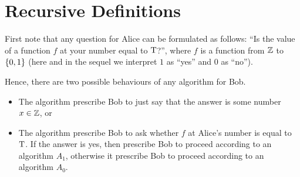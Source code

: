 \section{Recursive Definitions}
First note that any question for Alice can be formulated as follows:
``Is the value of a function $f$ at your number equal to $\text{T}$?'', where
$f$ is a function from ${\mathbb{Z}}$ to $\set{0, 1}$ (here and in the sequel
we interpret $1$ as ``yes'' and $0$ as ``no'').

Hence, there are two possible behaviours of any algorithm for Bob.
\begin{itemize}
  \item The algorithm prescribe Bob to just say that the answer is some
    number $x \in {\mathbb{Z}}$, or
  \item The algorithm prescribe Bob to ask whether $f$ at Alice's number is
    equal to $\text{T}$. If the answer is yes, then prescribe Bob to proceed
    according to an algorithm $A_1$, otherwise it prescribe Bob to proceed
    according to an algorithm $A_0$.
\end{itemize}

